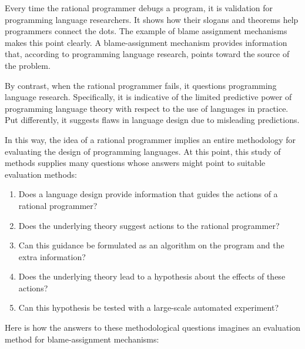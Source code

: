

Every time the rational programmer debugs a program, it is validation for
programming language researchers. It shows how their slogans and theorems help
programmers connect the dots. The example of blame assignment mechanisms makes
this point clearly. A blame-assignment mechanism provides information that,
according to programming language research, points toward the source of the
problem.

By contrast, when the rational programmer fails, it questions programming
language research. Specifically, it is indicative of the limited predictive
power of programming language theory with respect to the use of languages in
practice. Put differently, it suggests flaws in language design due to
misleading predictions.

In this way, the idea of a rational programmer implies an entire methodology for
evaluating the design of programming languages. At this point, this study of
methods supplies many questions whose answers might point to suitable evaluation
methods: 

\begin{enumerate} 

\item Does a language design provide information that guides the actions of a
 rational programmer?

\item Does the underlying theory suggest actions to the rational programmer?

\item Can this guidance be formulated as an algorithm on the program and the extra
information?

\item Does the underlying theory lead to a hypothesis about the effects of
 these actions? 

\item Can this hypothesis be tested with a large-scale automated experiment?

\end{enumerate}

Here is how the answers to these methodological questions imagines an evaluation
method for blame-assignment mechanisms: 

